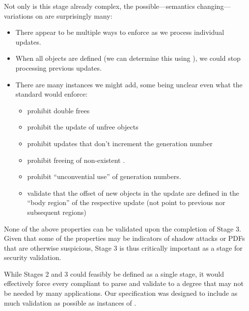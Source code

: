 Not only is this stage already complex, the
possible---semantics changing---variations on
 are surprisingly many:
\begin{itemize}
\item There appear to be multiple ways to enforce  as we
  process individual updates.
\item When all objects are defined (we can determine this using
  ), we could stop processing previous updates.
\item There are many  instances we might add,
  some being unclear even what the standard would enforce:
  \begin{itemize}
  \item prohibit double frees
  \item prohibit the update of unfree objects
  \item prohibit updates that don't increment the generation number
  \item prohibit freeing of non-existent \objids{}.
  \item prohibit ``unconvential use'' of generation numbers.
  \item validate that the offset of new objects in the update are
    defined in the ``body region'' of the respective update (not point
    to previous nor subsequent regions)
  \end{itemize}
\end{itemize}
%
None of the above properties can be validated upon the completion of Stage 3.
%
Given that some of the properties may be indicators of shadow attacks or PDFs that are otherwise suspicious, Stage 3 is thus critically important as a stage for security validation.

While Stages 2 and 3 could feasibly be defined as a single stage, it would effectively force every compliant to parse and validate to a degree that may not be needed by many applications.
%
Our specification was designed to include as much validation as possible as instances of .
%


